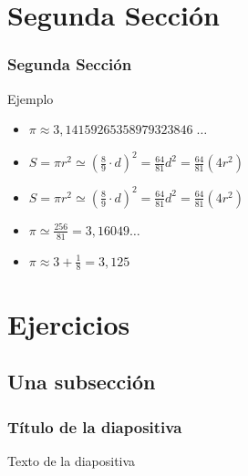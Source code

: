 \documentclass{beamer}
\begin{document}
\section{Segunda Sección}


\begin{frame}

\frametitle{Segunda Sección}

\begin{block}{Ejemplo}
  \begin{itemize}
  \item
    $\pi \approx 3,14159265358979323846 \; \dots $
  \pause

  \item
   $ S = \pi r^2 \simeq \left ( \frac{8}{9} \cdot d \right )^2 = \frac{64}{81} d^2 = \frac{64}{81} \left(4 r^2\right) $
  \pause
  \item
    $S = \pi r^2 \simeq \left ( \frac{8}{9} \cdot d \right )^2 = \frac{64}{81} d^2 = \frac{64}{81} \left(4 r^2\right) $
  \pause
  \item
    $\pi \simeq \frac{256}{81} = 3{,}16049 \ldots $
  \pause
  \item
   $\pi \approx 3 + \frac{1}{8} = 3,125 $

  \end{itemize}
\end{block}

\end{frame}

\section{Ejercicios}

\subsection{Una subsección}
\begin{frame}
\frametitle{Título de la diapositiva}

Texto de la diapositiva
\end{frame}
\end{document}
